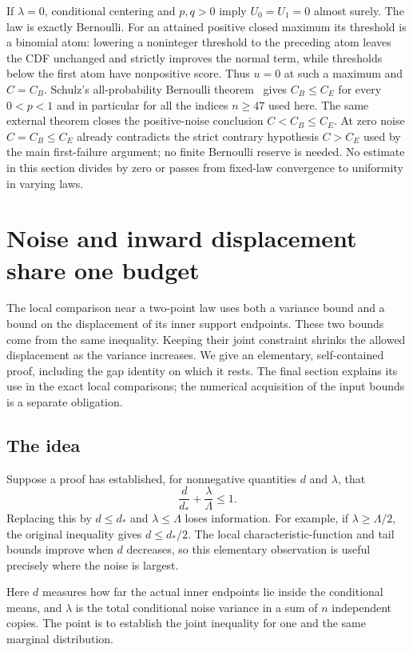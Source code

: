 If $\lambda=0$, conditional centering and $p,q>0$ imply $U_0=U_1=0$
almost surely. The law is exactly Bernoulli. For an attained positive closed
maximum its threshold is a binomial atom: lowering a noninteger threshold
to the preceding atom leaves the CDF unchanged and strictly improves the
normal term, while thresholds below the first atom have nonpositive score.
Thus $u=0$ at such a maximum and $C=C_B$. Schulz's all-probability
Bernoulli theorem~\cite[Theorem~1]{Schulz2016} gives $C_B\le C_E$ for every
$0<p<1$ and in particular for all the indices $n\ge47$ used here. The same
external theorem closes the positive-noise conclusion $C<C_B\le C_E$.
At zero noise $C=C_B\le C_E$ already contradicts the strict contrary
hypothesis $C> C_E$ used by the main first-failure argument; no
finite Bernoulli reserve is needed. No estimate
in this section divides by zero or passes from fixed-law convergence to
uniformity in varying laws.


\section{Noise and inward displacement share one budget}



The local comparison near a two-point law uses both a variance bound and
a bound on the displacement of its inner support endpoints. These two
bounds come from the same inequality. Keeping their joint constraint
shrinks the allowed displacement as the variance increases. We give an
elementary, self-contained proof, including the gap identity on which it
rests. The final section explains its use in the exact local comparisons;
the numerical acquisition of the input bounds is a separate obligation.


\subsection{The idea}
Suppose a proof has established, for nonnegative quantities $d$ and
$\lambda$, that
\[
             \frac{d}{d_*}+\frac{\lambda}{\Lambda}\le1.
\]
Replacing this by $d\le d_*$ and $\lambda\le\Lambda$ loses information.
For example, if $\lambda\ge\Lambda/2$, the original inequality gives
$d\le d_*/2$. The local characteristic-function and tail bounds improve
when $d$ decreases, so this elementary observation is useful precisely
where the noise is largest.

Here $d$ measures how far the actual inner endpoints lie inside the
conditional means, and $\lambda$ is the total conditional noise variance
in a sum of $n$ independent copies. The point is to establish the joint
inequality for one and the same marginal distribution.

